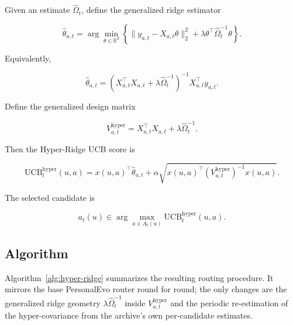 \documentclass{article} %
\begin{document}
Given an estimate $\widehat{\Omega}_t$, define the generalized ridge estimator

\[
\widehat{\theta}_{a,t}
= \arg\min_{\theta \in \mathbb{R}^d}
\left\{ \| y_{a,t} - X_{a,t}\theta \|_2^2
      + \lambda \theta^\top \widehat{\Omega}_t^{-1} \theta \right\}.
\]

Equivalently,

\[
\widehat{\theta}_{a,t}
= \left( X_{a,t}^\top X_{a,t} + \lambda \widehat{\Omega}_t^{-1} \right)^{-1}
  X_{a,t}^\top y_{a,t}.
\]

Define the generalized design matrix

\[
V_{a,t}^{\mathrm{hyper}} = X_{a,t}^\top X_{a,t} + \lambda \widehat{\Omega}_t^{-1}.
\]

Then the Hyper-Ridge UCB score is

\[
\mathrm{UCB}_t^{\mathrm{hyper}}(u, a)
= x(u, a)^\top \widehat{\theta}_{a,t}
+ \alpha \sqrt{ x(u, a)^\top \left( V_{a,t}^{\mathrm{hyper}} \right)^{-1} x(u, a) }.
\]

The selected candidate is

\[
a_t(u) \in \arg\max_{a \in A_t(u)} \mathrm{UCB}_t^{\mathrm{hyper}}(u, a).
\]


\subsection{Algorithm}

\label{sec:method-alg}

Algorithm~\ref{alg:hyper-ridge} summarizes the resulting routing procedure.
It mirrors the base PersonalEvo router round for round; the only changes are
the generalized ridge geometry $\lambda \widehat{\Omega}_t^{-1}$ inside
$V_{a,t}^{\mathrm{hyper}}$ and the periodic re-estimation of the
hyper-covariance from the archive's own per-candidate estimates.
\end{document}
